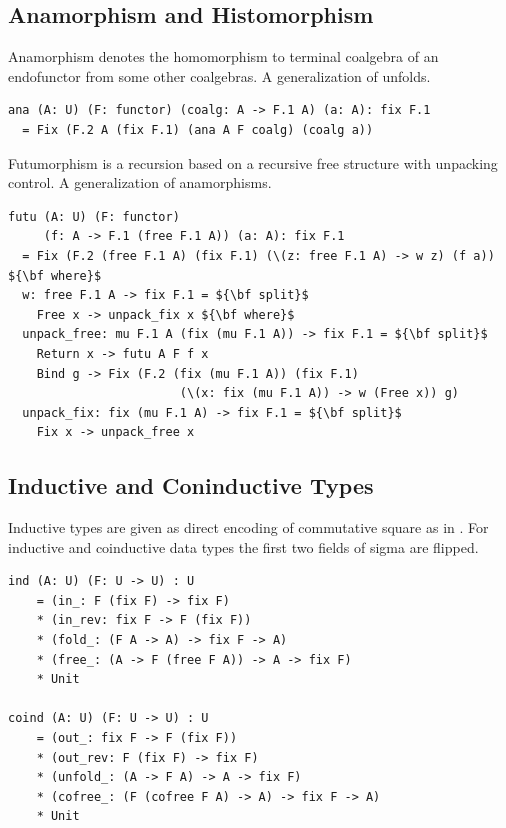 \documentclass{article}
\begin{document}
\subsection{Anamorphism and Histomorphism}

Anamorphism denotes the homomorphism to terminal coalgebra of an endofunctor
from some other coalgebras. A generalization of unfolds.

\begin{lstlisting}[mathescape=true]
ana (A: U) (F: functor) (coalg: A -> F.1 A) (a: A): fix F.1
  = Fix (F.2 A (fix F.1) (ana A F coalg) (coalg a))
\end{lstlisting}

Futumorphism is a recursion based on a recursive free structure with unpacking control.
A generalization of anamorphisms.

\begin{lstlisting}[mathescape=true]
futu (A: U) (F: functor)
     (f: A -> F.1 (free F.1 A)) (a: A): fix F.1
  = Fix (F.2 (free F.1 A) (fix F.1) (\(z: free F.1 A) -> w z) (f a)) ${\bf where}$
  w: free F.1 A -> fix F.1 = ${\bf split}$
    Free x -> unpack_fix x ${\bf where}$
  unpack_free: mu F.1 A (fix (mu F.1 A)) -> fix F.1 = ${\bf split}$
    Return x -> futu A F f x
    Bind g -> Fix (F.2 (fix (mu F.1 A)) (fix F.1)
                        (\(x: fix (mu F.1 A)) -> w (Free x)) g)
  unpack_fix: fix (mu F.1 A) -> fix F.1 = ${\bf split}$
    Fix x -> unpack_free x
\end{lstlisting}

\subsection{Inductive and Coninductive Types}

Inductive types are given as direct encoding of commutative square as in \cite{Wu13}.
For inductive and coinductive data types the first two fields of sigma are flipped.

\begin{lstlisting}[mathescape=true]
ind (A: U) (F: U -> U) : U
    = (in_: F (fix F) -> fix F)
    * (in_rev: fix F -> F (fix F))
    * (fold_: (F A -> A) -> fix F -> A)
    * (free_: (A -> F (free F A)) -> A -> fix F)
    * Unit

coind (A: U) (F: U -> U) : U
    = (out_: fix F -> F (fix F))
    * (out_rev: F (fix F) -> fix F)
    * (unfold_: (A -> F A) -> A -> fix F)
    * (cofree_: (F (cofree F A) -> A) -> fix F -> A)
    * Unit
\end{lstlisting}
\end{document}
